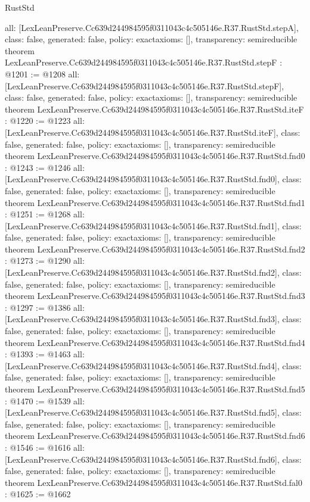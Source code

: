 \begin{lexlean}{RustStd}
\begin{coremodule}
{  all: [LexLeanPreserve.Cc639d244984595f0311043c4c505146e.R37.RustStd.stepA],
  class: false,
  generated: false,
  policy: exact{axioms: []},
  transparency: semireducible
}
theorem LexLeanPreserve.Cc639d244984595f0311043c4c505146e.R37.RustStd.stepF : @1201 := @1208 {
  all: [LexLeanPreserve.Cc639d244984595f0311043c4c505146e.R37.RustStd.stepF],
  class: false,
  generated: false,
  policy: exact{axioms: []},
  transparency: semireducible
}
theorem LexLeanPreserve.Cc639d244984595f0311043c4c505146e.R37.RustStd.iteF : @1220 := @1223 {
  all: [LexLeanPreserve.Cc639d244984595f0311043c4c505146e.R37.RustStd.iteF],
  class: false,
  generated: false,
  policy: exact{axioms: []},
  transparency: semireducible
}
theorem LexLeanPreserve.Cc639d244984595f0311043c4c505146e.R37.RustStd.fnd0 : @1243 := @1246 {
  all: [LexLeanPreserve.Cc639d244984595f0311043c4c505146e.R37.RustStd.fnd0],
  class: false,
  generated: false,
  policy: exact{axioms: []},
  transparency: semireducible
}
theorem LexLeanPreserve.Cc639d244984595f0311043c4c505146e.R37.RustStd.fnd1 : @1251 := @1268 {
  all: [LexLeanPreserve.Cc639d244984595f0311043c4c505146e.R37.RustStd.fnd1],
  class: false,
  generated: false,
  policy: exact{axioms: []},
  transparency: semireducible
}
theorem LexLeanPreserve.Cc639d244984595f0311043c4c505146e.R37.RustStd.fnd2 : @1273 := @1290 {
  all: [LexLeanPreserve.Cc639d244984595f0311043c4c505146e.R37.RustStd.fnd2],
  class: false,
  generated: false,
  policy: exact{axioms: []},
  transparency: semireducible
}
theorem LexLeanPreserve.Cc639d244984595f0311043c4c505146e.R37.RustStd.fnd3 : @1297 := @1386 {
  all: [LexLeanPreserve.Cc639d244984595f0311043c4c505146e.R37.RustStd.fnd3],
  class: false,
  generated: false,
  policy: exact{axioms: []},
  transparency: semireducible
}
theorem LexLeanPreserve.Cc639d244984595f0311043c4c505146e.R37.RustStd.fnd4 : @1393 := @1463 {
  all: [LexLeanPreserve.Cc639d244984595f0311043c4c505146e.R37.RustStd.fnd4],
  class: false,
  generated: false,
  policy: exact{axioms: []},
  transparency: semireducible
}
theorem LexLeanPreserve.Cc639d244984595f0311043c4c505146e.R37.RustStd.fnd5 : @1470 := @1539 {
  all: [LexLeanPreserve.Cc639d244984595f0311043c4c505146e.R37.RustStd.fnd5],
  class: false,
  generated: false,
  policy: exact{axioms: []},
  transparency: semireducible
}
theorem LexLeanPreserve.Cc639d244984595f0311043c4c505146e.R37.RustStd.fnd6 : @1546 := @1616 {
  all: [LexLeanPreserve.Cc639d244984595f0311043c4c505146e.R37.RustStd.fnd6],
  class: false,
  generated: false,
  policy: exact{axioms: []},
  transparency: semireducible
}
theorem LexLeanPreserve.Cc639d244984595f0311043c4c505146e.R37.RustStd.fal0 : @1625 := @1662 {
}
\end{coremodule}
\end{lexlean}
